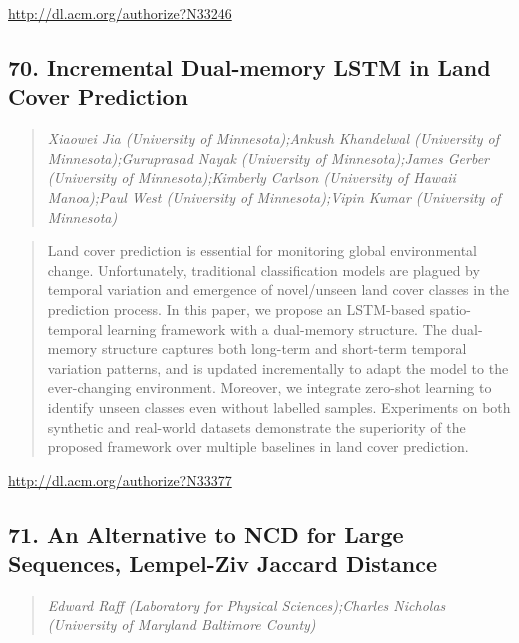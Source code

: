 \documentclass{article}
\begin{document}
\href{http://dl.acm.org/authorize?N33246}{http://dl.acm.org/authorize?N33246}

\subsection{70. Incremental Dual-memory LSTM in Land Cover Prediction}

\begin{quote}
\footnotesize{\textit{Xiaowei Jia (University of Minnesota);Ankush Khandelwal (University of Minnesota);Guruprasad Nayak (University of Minnesota);James Gerber (University of Minnesota);Kimberly Carlson (University of Hawaii Manoa);Paul West (University of Minnesota);Vipin Kumar (University of Minnesota)}}

\end{quote}

\begin{quote}
Land cover prediction is essential for monitoring global environmental change. Unfortunately, traditional classification models are plagued by temporal variation and emergence of novel/unseen land cover classes in the prediction process. In this paper, we propose an LSTM-based spatio-temporal learning framework with a dual-memory structure. The dual-memory structure captures both long-term and short-term temporal variation patterns, and is updated incrementally to adapt the model to the ever-changing environment. Moreover, we integrate zero-shot learning to identify unseen classes even without labelled samples. Experiments on both synthetic and real-world datasets demonstrate the superiority of the proposed framework over multiple baselines in land cover prediction.
\end{quote}

\href{http://dl.acm.org/authorize?N33377}{http://dl.acm.org/authorize?N33377}

\subsection{71. An Alternative to NCD for Large Sequences, Lempel-Ziv Jaccard Distance}

\begin{quote}
\footnotesize{\textit{Edward Raff (Laboratory for Physical Sciences);Charles Nicholas (University of Maryland Baltimore County)}}

\end{quote}
\end{document}
